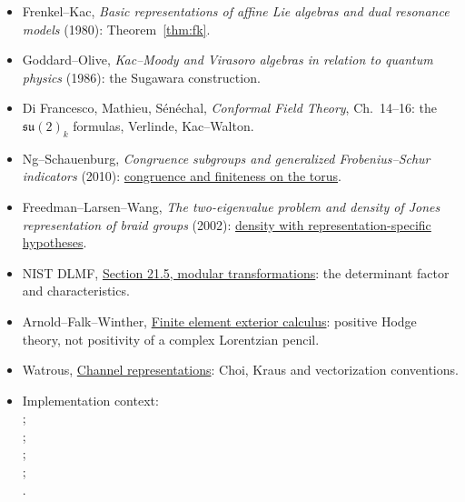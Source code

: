 \documentclass[11pt]{article}
\theoremstyle{definition}
\theoremstyle{remark}
\begin{document}
\begin{itemize}[nosep]
    Weyl group), 10--13 (integrable modules, the character formula and the
    modular matrices of Sections~\ref{sec:affine}--\ref{sec:verlinde}).
  \item Frenkel--Kac, \emph{Basic representations of affine Lie algebras
    and dual resonance models} (1980): Theorem~\ref{thm:fk}.
  \item Goddard--Olive, \emph{Kac--Moody and Virasoro algebras in relation
    to quantum physics} (1986): the Sugawara construction.
  \item Di Francesco, Mathieu, S\'en\'echal, \emph{Conformal Field Theory},
    Ch.~14--16: the $\mathfrak{su}(2)_k$ formulas, Verlinde, Kac--Walton.
  \item Ng--Schauenburg, \emph{Congruence subgroups and generalized
    Frobenius--Schur indicators} (2010):
    \href{https://arxiv.org/abs/0806.2493}{congruence and finiteness on the torus}.
  \item Freedman--Larsen--Wang, \emph{The two-eigenvalue problem and
    density of Jones representation of braid groups} (2002):
    \href{https://arxiv.org/abs/math/0103200}{density with representation-specific hypotheses}.
  \item NIST DLMF, \href{https://dlmf.nist.gov/21.5}{Section 21.5,
    modular transformations}: the determinant factor and characteristics.
  \item Arnold--Falk--Winther,
    \href{https://arxiv.org/abs/0906.4325}{Finite element exterior calculus}:
    positive Hodge theory, not positivity of a complex Lorentzian pencil.
  \item Watrous,
    \href{https://cs.uwaterloo.ca/~watrous/TQI-notes/TQI-notes.05.pdf}{Channel representations}:
    Choi, Kraus and vectorization conventions.
  \item Implementation context:\\
    ;\\
    ;\\
    ;\\
    ;\\
    .
\end{itemize}
\endgroup
\end{document}
